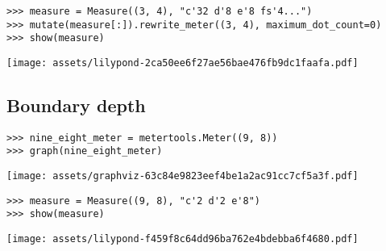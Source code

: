 \begin{singlespacing}
\vspace{-0.5\baselineskip}
\begin{lstlisting}
>>> measure = Measure((3, 4), "c'32 d'8 e'8 fs'4...")
>>> mutate(measure[:]).rewrite_meter((3, 4), maximum_dot_count=0)
>>> show(measure)
\end{lstlisting}
\noindent\texttt{[image: assets/lilypond-2ca50ee6f27ae56bae476fb9dc1faafa.pdf]}
\end{singlespacing}

\subsection{Boundary depth} %

\begin{comment}
<abjad>
nine_eight_meter = metertools.Meter((9, 8))
graph(nine_eight_meter)
</abjad>
\end{comment}

\begin{singlespacing}
\vspace{-0.5\baselineskip}
\begin{lstlisting}
>>> nine_eight_meter = metertools.Meter((9, 8))
>>> graph(nine_eight_meter)
\end{lstlisting}
\noindent\texttt{[image: assets/graphviz-63c84e9823eef4be1a2ac91cc7cf5a3f.pdf]}
\end{singlespacing}

\begin{comment}
<abjad>
measure = Measure((9, 8), "c'2 d'2 e'8")
show(measure)
</abjad>
\end{comment}

\begin{singlespacing}
\vspace{-0.5\baselineskip}
\begin{lstlisting}
>>> measure = Measure((9, 8), "c'2 d'2 e'8")
>>> show(measure)
\end{lstlisting}
\noindent\texttt{[image: assets/lilypond-f459f8c64dd96ba762e4bdebba6f4680.pdf]}
\end{singlespacing}

\begin{comment}
<abjad>
mutate(measure[:]).rewrite_meter(nine_eight_meter)
show(measure)
</abjad>
\end{comment}

